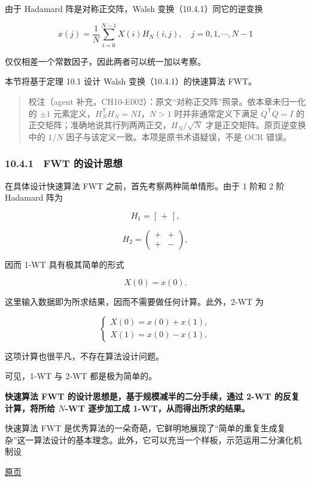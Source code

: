 \documentclass[
  10pt,
  fontset=fandol]{ctexart}
\begin{document}
由于 Hadamard 阵是对称正交阵，Walsh 变换（10.4.1）同它的逆变换

\[
x(j)=\frac1N\sum_{i=0}^{N-1}X(i)H_N(i,j),\quad j=0,1,\cdots,N-1
\]

仅仅相差一个常数因子，因此两者可以统一加以考察。

本节将基于定理 10.1 设计 Walsh 变换（10.4.1）的快速算法 FWT。

\begin{quote}
校注（agent 补充，CH10-E002）：原文``对称正交阵''照录。依本章未归一化的 \(\pm1\) 元素定义，\(H_N^\mathsf{T}H_N=NI\)，\(N>1\) 时并非通常定义下满足 \(Q^\mathsf{T}Q=I\) 的正交矩阵；准确地说其行列两两正交，\(H_N/\sqrt N\) 才是正交矩阵。原页逆变换中的 \(1/N\) 因子与该定义一致。本项是原书术语疑误，不是 OCR 错误。
\end{quote}

\subsubsection{10.4.1　FWT 的设计思想}\label{fwt-ux7684ux8bbeux8ba1ux601dux60f3}

在具体设计快速算法 FWT 之前，首先考察两种简单情形。由于 1 阶和 2 阶 Hadamard 阵为

\[
H_1=[\,+\,],
\]

\[
H_2=\begin{pmatrix}+&+\\+&-\end{pmatrix},
\]

因而 1-WT 具有极其简单的形式

\[
X(0)=x(0).
\]

这里输入数据即为所求结果，因而不需要做任何计算。此外，2-WT 为

\[
\begin{cases}
X(0)=x(0)+x(1),\\
X(1)=x(0)-x(1).
\end{cases}
\]

这项计算也很平凡，不存在算法设计问题。

可见，1-WT 与 2-WT 都是极为简单的。

\textbf{快速算法 FWT 的设计思想是，基于规模减半的二分手续，通过 2-WT 的反复计算，将所给 \(N\)-WT 逐步加工成 1-WT，从而得出所求的结果。}

快速算法 FWT 是优秀算法的一朵奇葩，它鲜明地展现了``简单的重复生成复杂''这一算法设计的基本理念。此外，它可以充当一个样板，示范运用二分演化机制设

\href{../../source-images/pdf-271.jpeg}{原页}
\end{document}
